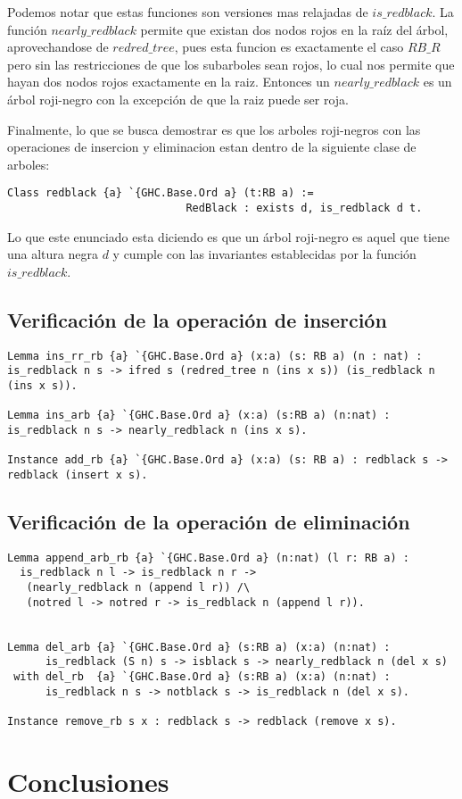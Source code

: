 \documentclass[letterpaper,12pt,oneside]{book}
\newcommand{\arn}{árbol roji-negro }
\newcommand{\arns}{arboles roji-negros }
\begin{document}
Podemos notar que estas funciones son versiones mas relajadas de $is\_redblack$. La funci\'on $nearly\_redblack$ permite que existan dos nodos rojos
en la ra\'iz del \'arbol, aprovechandose de $redred\_tree$, pues esta funcion es exactamente el caso $RB\_R$ pero sin las restricciones de que los subarboles sean rojos, lo 
cual nos permite que hayan dos nodos rojos exactamente en la raiz. Entonces un $nearly\_redblack$ es un \arn con la excepci\'on de que la raiz puede ser roja. 

Finalmente, lo que se busca demostrar es que los \arns con las operaciones de insercion y eliminacion estan dentro de la siguiente clase de arboles:

\begin{verbatim}
Class redblack {a} `{GHC.Base.Ord a} (t:RB a) := 
                            RedBlack : exists d, is_redblack d t.
\end{verbatim}

Lo que este enunciado esta diciendo es que un \arn es aquel que tiene una altura negra $d$ y cumple con las invariantes establecidas por la funci\'on 
$is\_redblack$.
\section{Verificación de la operación de inserción}
\begin{verbatim}
Lemma ins_rr_rb {a} `{GHC.Base.Ord a} (x:a) (s: RB a) (n : nat) :
is_redblack n s -> ifred s (redred_tree n (ins x s)) (is_redblack n (ins x s)).

Lemma ins_arb {a} `{GHC.Base.Ord a} (x:a) (s:RB a) (n:nat) : 
is_redblack n s -> nearly_redblack n (ins x s).

Instance add_rb {a} `{GHC.Base.Ord a} (x:a) (s: RB a) : redblack s -> redblack (insert x s).
\end{verbatim}
\section{Verificación de la operación de eliminación}
\begin{verbatim}
Lemma append_arb_rb {a} `{GHC.Base.Ord a} (n:nat) (l r: RB a) : 
  is_redblack n l -> is_redblack n r ->
   (nearly_redblack n (append l r)) /\
   (notred l -> notred r -> is_redblack n (append l r)).


Lemma del_arb {a} `{GHC.Base.Ord a} (s:RB a) (x:a) (n:nat) :
      is_redblack (S n) s -> isblack s -> nearly_redblack n (del x s)
 with del_rb  {a} `{GHC.Base.Ord a} (s:RB a) (x:a) (n:nat) :
      is_redblack n s -> notblack s -> is_redblack n (del x s).

Instance remove_rb s x : redblack s -> redblack (remove x s).
\end{verbatim}
\chapter{Conclusiones}  

%
%

\backmatter%
\end{document}
